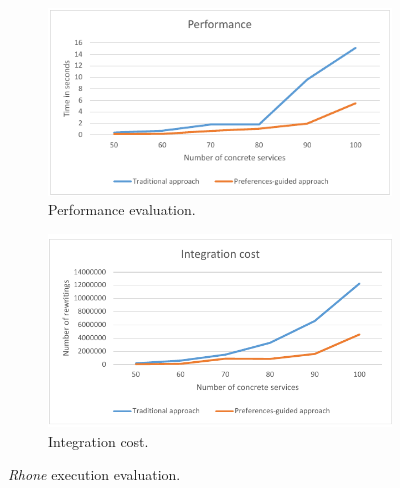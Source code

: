 \begin{figure}
\centering
\begin{subfigure}{.5\textwidth}
  \centering
  \includegraphics[scale=0.61]{fig1.pdf}
  \caption{Performance evaluation.}
  \label{fig01}
\end{subfigure}%
\begin{subfigure}{.5\textwidth}
  \centering
  \includegraphics[scale=0.53]{fig2.pdf}
  \caption{Integration cost.}\label{fig02}
\end{subfigure}
\caption{\textit{Rhone} execution evaluation.}
\label{fig:figs-exp}
\end{figure}

% 


